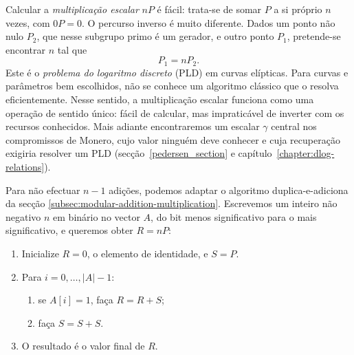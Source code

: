 Calcular a {\em multiplicação escalar} \(nP\) é fácil: trata-se de somar \(P\)
a si próprio \(n\) vezes, com \(0P=0\). O percurso inverso é muito diferente.
Dados um ponto não nulo \(P_2\), que nesse subgrupo primo é um gerador, e outro
ponto \(P_1\), pretende-se encontrar \(n\) tal que
\[
P_1=nP_2.
\]
Este é o {\em problema do logaritmo discreto} (PLD) em curvas elípticas.
 Para
curvas e parâmetros bem escolhidos, não se conhece um algoritmo clássico que
o resolva eficientemente. Nesse sentido, a multiplicação escalar funciona como
uma operação de sentido único: fácil de calcular, mas impraticável de inverter
com os recursos conhecidos. Mais adiante encontraremos um escalar \(\gamma\)
central nos compromissos de Monero, cujo valor ninguém deve conhecer e cuja
recuperação exigiria resolver um PLD (secção~\ref{pedersen_section} e capítulo~\ref{chapter:dlog-relations}).

Para não efectuar \(n-1\) adições, podemos adaptar o algoritmo
duplica-e-adiciona da secção \ref{subsec:modular-addition-multiplication}.
Escrevemos um inteiro não negativo \(n\) em binário no vector \(A\), do bit
menos significativo para o mais significativo, e queremos obter \(R=nP\):


\begin{enumerate}
    \item Inicialize \(R=0\), o elemento de identidade, e \(S=P\).
    \item Para \(i=0,\ldots,|A|-1\):
    \begin{enumerate}
        \item se \(A[i]=1\), faça \(R=R+S\);
        \item faça \(S=S+S\).
    \end{enumerate}
    \item O resultado é o valor final de \(R\).
\end{enumerate}



